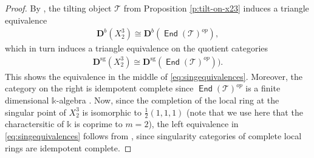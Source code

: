 \documentclass[a4paper,11pt, reqno]{amsart}
\def\DD{\mathbf D}
\def\sT{\mathscr{T}}
\newcommand{\opname}[1]{\operatorname{\mathsf{#1}}}
\newcommand{\End}{\opname{End}}
\newcommand{\op}{^{op}}
\def\Dsg{\DD^{\mathrm{sg}}}
\def\Db{\DD^b}
\theoremstyle{plain}
\theoremstyle{definition}
\numberwithin{equation}{section}
\begin{document}
\begin{proof}
    By \cite[Theorem 7.6]{hille-van-den-bergh}, the tilting object $\sT$ from Proposition \ref{p:tilt-on-x23} induces a triangle equivalence
    \begin{align}
        \Db(X_2^3) \cong \Db(\End(\sT)\op),
    \end{align}
    which in turn induces a triangle equivalence on the quotient categories
    \begin{align}
        \Dsg(X_2^3) \cong \Dsg(\End(\sT)\op)).
    \end{align} This shows the equivalence in the middle of \eqref{eq:singequivalences}.
    Moreover, the category on the right is idempotent complete since $\End(\sT)\op$ is a finite dimensional $\mathbb{k}$-algebra \cite[Corollary 2.4]{chenradical}. Now, since the completion of the local ring at the singular point of $X_2^3$ is isomorphic to $\frac{1}{2}(1,1,1)$ (note that we use here that the charactersitic of $\mathbb{k}$ is coprime to $m=2$), the left equivalence in \eqref{eq:singequivalences} follows from \cite{OrlovIdemp}, since singularity categories of complete local rings are idempotent complete.


\end{proof}
\end{document}
